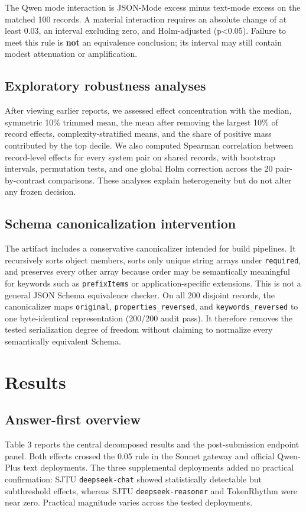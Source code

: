 \documentclass[11pt,a4paper]{article}
\begin{document}
The Qwen mode interaction is JSON-Mode excess minus text-mode excess on the matched 100 records. A material interaction requires an absolute change of at least 0.03, an interval excluding zero, and Holm-adjusted (p<0.05). Failure to meet this rule is \textbf{not} an equivalence conclusion; its interval may still contain modest attenuation or amplification.

\subsection{Exploratory robustness analyses}
After viewing earlier reports, we assessed effect concentration with the median, symmetric 10\% trimmed mean, the mean after removing the largest 10\% of record effects, complexity-stratified means, and the share of positive mass contributed by the top decile. We also computed Spearman correlation between record-level effects for every system pair on shared records, with bootstrap intervals, permutation tests, and one global Holm correction across the 20 pair-by-contrast comparisons. These analyses explain heterogeneity but do not alter any frozen decision.

\subsection{Schema canonicalization intervention}
The artifact includes a conservative canonicalizer intended for build pipelines. It recursively sorts object members, sorts only unique string arrays under \texttt{required}, and preserves every other array because order may be semantically meaningful for keywords such as \texttt{prefixItems} or application-specific extensions. This is not a general JSON Schema equivalence checker. On all 200 disjoint records, the canonicalizer maps \texttt{original}, \texttt{properties\_reversed}, and \texttt{keywords\_reversed} to one byte-identical representation (200/200 audit pass). It therefore removes the tested serialization degree of freedom without claiming to normalize every semantically equivalent Schema.

\section{Results}
\subsection{Answer-first overview}
Table 3 reports the central decomposed results and the post-submission endpoint panel. Both effects crossed the 0.05 rule in the Sonnet gateway and official Qwen-Plus text deployments. The three supplemental deployments added no practical confirmation: SJTU \texttt{deepseek-chat} showed statistically detectable but subthreshold effects, whereas SJTU \texttt{deepseek-reasoner} and TokenRhythm were near zero. Practical magnitude varies across the tested deployments.
\end{document}

